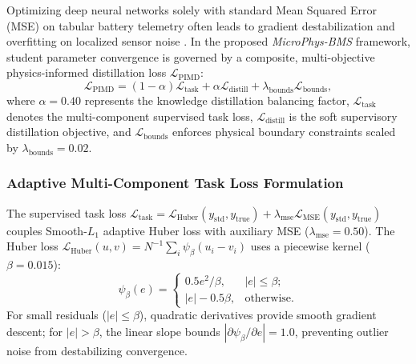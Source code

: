 Optimizing deep neural networks solely with standard Mean Squared Error (MSE) on tabular battery telemetry often leads to gradient destabilization and overfitting on localized sensor noise \cite{karniadakis2021physics, li2026condition}. In the proposed \textit{MicroPhys-BMS} framework, student parameter convergence is governed by a composite, multi-objective physics-informed distillation loss $\mathcal{L}_{\text{PIMD}}$:
\begin{equation}
	\label{eq:total_piml_loss}
	\mathcal{L}_{\text{PIMD}} = (1 - \alpha) \mathcal{L}_{\text{task}} + \alpha \mathcal{L}_{\text{distill}} + \lambda_{\text{bounds}} \mathcal{L}_{\text{bounds}},
\end{equation}
where $\alpha = 0.40$ represents the knowledge distillation balancing factor, $\mathcal{L}_{\text{task}}$ denotes the multi-component supervised task loss, $\mathcal{L}_{\text{distill}}$ is the soft supervisory distillation objective, and $\mathcal{L}_{\text{bounds}}$ enforces physical boundary constraints scaled by $\lambda_{\text{bounds}} = 0.02$.

\subsubsection{Adaptive Multi-Component Task Loss Formulation}
The supervised task loss $\mathcal{L}_{\text{task}} = \mathcal{L}_{\text{Huber}}(y_{\text{std}}, y_{\text{true}}) + \lambda_{\text{mse}} \mathcal{L}_{\text{MSE}}(y_{\text{std}}, y_{\text{true}})$ couples Smooth-$L_1$ adaptive Huber loss with auxiliary MSE ($\lambda_{\text{mse}} = 0.50$). The Huber loss $\mathcal{L}_{\text{Huber}}(u, v) = N^{-1}\sum_i \psi_\beta(u_i - v_i)$ uses a piecewise kernel ($\beta = 0.015$):
\begin{equation}
	\label{eq:huber_kernel}
	\psi_\beta(e) = \begin{cases} 0.5 e^2 / \beta, & |e| \le \beta; \\ |e| - 0.5\beta, & \text{otherwise}. \end{cases}
\end{equation}
For small residuals ($|e| \le \beta$), quadratic derivatives provide smooth gradient descent; for $|e| > \beta$, the linear slope bounds $|\partial \psi_\beta / \partial e| = 1.0$, preventing outlier noise from destabilizing convergence.

